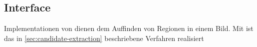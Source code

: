 \subsection{Interface }
Implementationen von  dienen dem Auffinden von Regionen in einem Bild.
Mit  ist das in \autoref{sec:candidate-extraction} beschriebene Verfahren realisiert 

